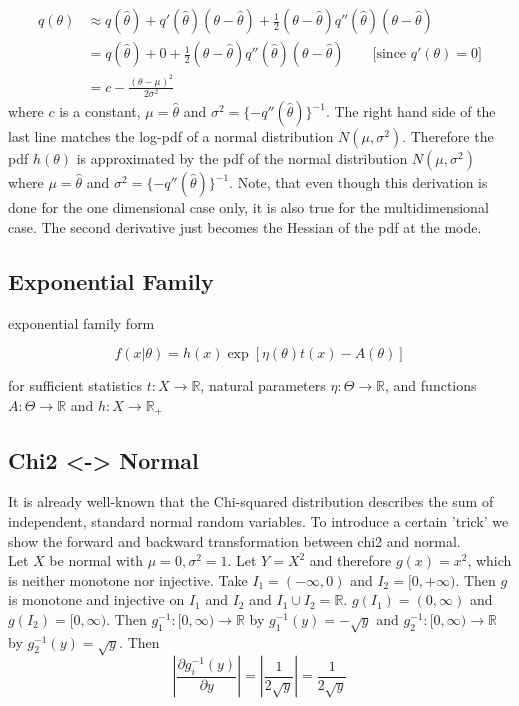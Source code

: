 \begin{align}
	q(\theta) &\approx q(\hat{\theta}) + q'(\hat{\theta})(\theta - \hat{\theta}) + \frac{1}{2}(\theta- \hat{\theta})q''(\hat{\theta}) (\theta - \hat{\theta})\\
	&= 	q(\hat{\theta}) + 0 +  \frac{1}{2}(\theta- \hat{\theta})q''(\hat{\theta}) (\theta - \hat{\theta}) \qquad \text{[since } q'(\theta) = 0]\\
	&= c - \frac{(\theta - \mu)^2}{2\sigma^2}
\end{align}
where $c$ is a constant, $\mu = \hat{\theta}$ and $\sigma^2 = \{-q''(\hat{\theta})\}^{-1}$. The right hand side of the last line matches the log-pdf of a normal distribution $N(\mu, \sigma^2)$. Therefore the pdf $h(\theta)$ is approximated by the pdf of the normal distribution $N(\mu, \sigma^2)$ where $\mu = \hat{\theta}$ and $\sigma^2 = \{-q''(\hat{\theta})\}^{-1}$. Note, that even though this derivation is done for the one dimensional case only, it is also true for the multidimensional case. The second derivative just becomes the Hessian of the pdf at the mode.

\subsection{Exponential Family}

exponential family form

\begin{equation}
 f(x|\theta) = h(x)\exp[\eta(\theta) t(x) - A(\theta)]
 \label{eq:exp_family}
\end{equation}

for sufficient statistics $t:X \rightarrow \mathbb{R}$, natural parameters $\eta: \Theta \rightarrow \mathbb{R}$, and functions $A: \Theta \rightarrow \mathbb{R}$ and $h: X \rightarrow \mathbb{R}_+$

\subsection{Chi2 <-> Normal}
\label{subsec:chi2-normal}

It is already well-known that the Chi-squared distribution describes the sum of independent, standard normal random variables. To introduce a certain 'trick' we show the forward and backward transformation between chi2 and normal.\\
Let $X$ be normal with $\mu = 0, \sigma^2 = 1$. Let $Y = X^2$ and therefore $g(x) = x^2$, which is neither monotone nor injective. Take $I_1 = (-\infty, 0)$ and $I_2 = [0, +\infty)$. Then $g$ is monotone and injective on $I_1$ and $I_2$ and $I_1 \cup I_2 = \mathbb{R}$. $g(I_1) = (0, \infty)$ and $g(I_2) = [0, \infty)$. Then $g_1^{-1}: [0, \infty) \rightarrow \mathbb{R}$ by $g_1^{-1}(y) = -\sqrt{y}$ and $g_2^{-1}: [0, \infty) \rightarrow \mathbb{R}$ by $g_2^{-1}(y) = \sqrt{y}$. Then
$$\left\vert \frac{\partial g_i^{-1}(y)}{\partial y} \right\vert = \left\vert \frac{1}{2 \sqrt{y}} \right\vert = \frac{1}{2 \sqrt{y}}$$

